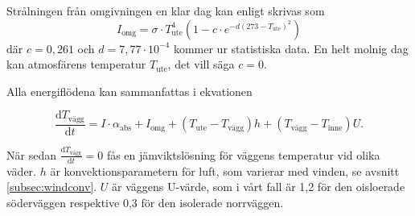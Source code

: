 Strålningen från omgivningen en klar dag kan enligt \cite{bb_atmosphere} skrivas som 
\begin{equation}
I_\text{omg}=\sigma\cdot T_\text{ute}^4(1-c \cdot e^{-d(273-T_\text{ute})^2})
\end{equation}
där $c=0,261$ och $d=7,77\cdot10^{-4}$ kommer ur statistiska data. En helt molnig dag kan atmosfärens temperatur $T_\text{ute}$, det vill säga $c=0$.

Alla energiflödena kan sammanfattas i ekvationen 

\begin{equation}\boxed{ \; \; \;
\label{eq:ekvtemp}
\frac{\mathrm{d}T_\text{vägg}}{\mathrm{d}t} = 
I\cdot \alpha_\text{abs} + I_\text{omg} + (T_\text{ute} - T_\text{vägg}) h +( T_\text{vägg} - T_\text{inne} ) U.
\; \; \;}\end{equation}

När sedan $\frac{\mathrm{d}T_\text{vägg}}{\mathrm{d}t}=0$ fås en jämviktslösning för väggens temperatur vid olika väder. $h$ är konvektionsparametern för luft, som varierar med vinden, se avsnitt \ref{subsec:windconv}. $U$ är väggens U-värde, som i vårt fall är 1,2 för den oisloerade söderväggen respektive 0,3 för den isolerade norrväggen.
